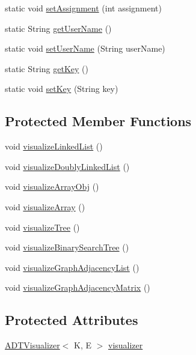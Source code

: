 \begin{DoxyCompactItemize}
\item 
static void \hyperlink{classbridges_1_1connect_1_1_bridges_a24c91901a59ab8b715a864ab8a4d9cdc}{set\+Assignment} (int assignment)
\item 
static String \hyperlink{classbridges_1_1connect_1_1_bridges_a5ff3fdd97d4c71c9c2141c3355e417aa}{get\+User\+Name} ()
\item 
static void \hyperlink{classbridges_1_1connect_1_1_bridges_a2d84103645662308e58a1b473d3320ae}{set\+User\+Name} (String user\+Name)
\item 
static String \hyperlink{classbridges_1_1connect_1_1_bridges_a813a1783f7b547fdb964f8af87c66f4b}{get\+Key} ()
\item 
static void \hyperlink{classbridges_1_1connect_1_1_bridges_a484992ce3fce273ca2caa215a4488e3c}{set\+Key} (String key)
\end{DoxyCompactItemize}
\subsection*{Protected Member Functions}
\begin{DoxyCompactItemize}
\item 
void \hyperlink{classbridges_1_1connect_1_1_bridges_ae9ce2673d2eef1da7f6e1359c494f6fe}{visualize\+Linked\+List} ()
\item 
void \hyperlink{classbridges_1_1connect_1_1_bridges_ac1ac1db8cf7123aefb83ab05af83375d}{visualize\+Doubly\+Linked\+List} ()
\item 
void \hyperlink{classbridges_1_1connect_1_1_bridges_a7533ebb339527a3a824fc7af21a1d5c9}{visualize\+Array\+Obj} ()
\item 
void \hyperlink{classbridges_1_1connect_1_1_bridges_ac4e90699b288fcfbaf19e59bc4dbafb3}{visualize\+Array} ()
\item 
void \hyperlink{classbridges_1_1connect_1_1_bridges_abd8fa1ef8d6c5d3e6c533ee069d24d85}{visualize\+Tree} ()
\item 
void \hyperlink{classbridges_1_1connect_1_1_bridges_a283d29561d78a890f01c8735c18d17d0}{visualize\+Binary\+Search\+Tree} ()
\item 
void \hyperlink{classbridges_1_1connect_1_1_bridges_a7470f7a358eee6a6cded3ab42f8b9cdc}{visualize\+Graph\+Adjacency\+List} ()
\item 
void \hyperlink{classbridges_1_1connect_1_1_bridges_a13c154c2a656dd4c19f2ff0e767f63c3}{visualize\+Graph\+Adjacency\+Matrix} ()
\end{DoxyCompactItemize}
\subsection*{Protected Attributes}
\begin{DoxyCompactItemize}
\item 
\hyperlink{classbridges_1_1base_1_1_a_d_t_visualizer}{A\+D\+T\+Visualizer}$<$ K, E $>$ \hyperlink{classbridges_1_1connect_1_1_bridges_af3fc35779b31c976ed8bf2e173310502}{visualizer}
\end{DoxyCompactItemize}



